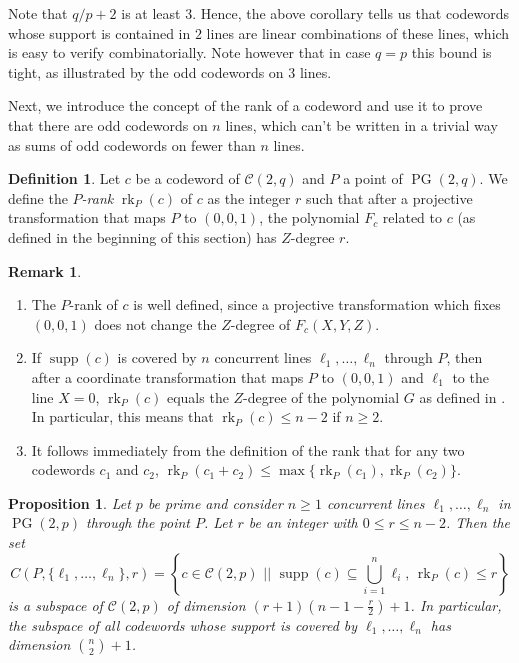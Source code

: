\documentclass[12pt, a4paper]{article}
\newtheorem{prop}[thm]{Proposition}
\theoremstyle{definition}
\newtheorem{rmk}[thm]{Remark}
\newtheorem{df}[thm]{Definition}
\newcommand{\sett}[2]{ \left\{ #1 \, \, || \, \, #2 \right \} }
\newcommand{\mc}{\mathcal C}
\DeclareMathOperator{\supp}{supp}
\DeclareMathOperator{\rk}{rk}
\DeclareMathOperator{\PG}{PG}
\newcommand{\pg}{\PG}
\begin{document}
Note that $q/p+2$ is at least $3$.
Hence, the above corollary tells us that codewords whose support is contained in $2$ lines are linear combinations of these lines, which is easy to verify combinatorially.
Note however that in case $q=p$ this bound is tight, as illustrated by the odd codewords on 3 lines.

\bigskip

Next, we introduce the concept of the rank of a codeword and use it to prove that there are odd codewords on $n$ lines, which can't be written in a trivial way as sums of odd codewords on fewer than $n$ lines.

\begin{df}
Let $c$ be a codeword of $\mc(2,q)$ and $P$ a point of $\pg(2,q)$.
We define the \emph{$P$-rank} $\rk_P(c)$ of $c$ as the integer $r$ such that after a projective transformation that maps $P$ to $(0,0,1)$, the polynomial $F_c$ related to $c$ (as defined in the beginning of this section) has $Z$-degree $r$.
\end{df}

\begin{rmk}
 \label{Rmk:Rank}
\begin{enumerate}
 \item The $P$-rank of $c$ is well defined, since a projective transformation which fixes $(0, 0, 1)$ does not change the $Z$-degree of $F_c(X, Y, Z)$.
 \item \label{Rmk:Rank:Concurrent} If $\supp(c)$ is covered by $n$ concurrent lines $\ell_1, \dots, \ell_n$ through $P$, then after a coordinate transformation that maps $P$ to $(0,0,1)$ and $\ell_1$ to the line $X=0$, $\rk_P(c)$ equals the $Z$-degree of the polynomial $G$ as defined in .
 In particular, this means that $\rk_P(c) \leq n-2$ if $n\geq 2$.
 \item \label{Rmk:Rank:Sum} It follows immediately from the definition of the rank that for any two codewords $c_1$ and $c_2$, $\rk_P(c_1+c_2) \leq \max\{\rk_P(c_1), \rk_P(c_2)\}$.
\end{enumerate}
\end{rmk}

\begin{prop}
 \label{Crl:ConcurrentCodeword}
 Let $p$ be prime and consider $n \geq 1$ concurrent lines $\ell_1, \dots, \ell_n$ in $\pg(2,p)$ through the point $P$.
 Let $r$ be an integer with $0 \leq r \leq n-2$.
 Then the set
 \[
  C(P,\{\ell_1,\dots,\ell_n\},r) = \sett{c \in \mc(2,p)}{\supp(c) \subseteq \bigcup_{i=1}^n \ell_i,\, \rk_P(c) \leq r}
 \]
 is a subspace of $\mc(2,p)$ of dimension $(r+1)\left(n-1-\frac r2\right)+1$.
 In particular, the subspace of all codewords whose support is covered by $\ell_1, \dots, \ell_n$ has dimension $\binom n2 + 1$.
\end{prop}
\end{document}
